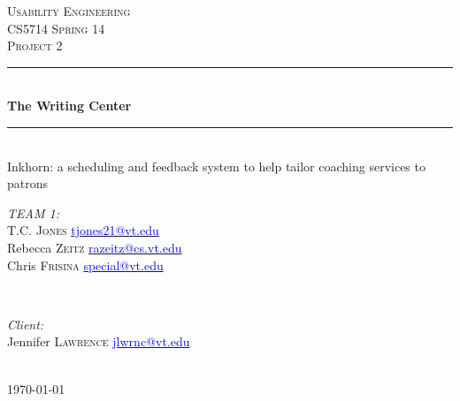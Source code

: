 \documentclass[12pt]{article} %
\begin{document}

\begin{titlepage}

\newcommand{\HRule}{\rule{\linewidth}{0.5mm}} %

\center %

\textsc{\LARGE Usability Engineering}\\[1.5cm] %
\textsc{\Large CS5714 Spring 14}\\[0.5cm] %
\textsc{\large Project 2}\\[0.5cm] %

\HRule \\[0.4cm]
{ \huge \bfseries The Writing Center }\\[0.4cm] %
\HRule \\[0.4cm]
{ \small Inkhorn: a scheduling and feedback system to help tailor coaching services to patrons }\\[0.4cm] %
\vspace{1.5cm}


\begin{minipage}{0.4\textwidth}
\begin{flushleft} \large
\emph{TEAM 1:}\\
T.C. \textsc{Jones} \href{mailto:tjones21@vt.edu}{\textcolor{blue}{tjones21@vt.edu}}\\
Rebecca \textsc{Zeitz} \href{mailto:razeitz@cs.vt.edu}{\textcolor{blue}{razeitz@cs.vt.edu}}\\
Chris \textsc{Frisina}  \href{mailto:special@vt.edu}{\textcolor{blue}{special@vt.edu}}\\
\end{flushleft}
\end{minipage}
~
\begin{minipage}{0.4\textwidth}
\begin{flushright} \large
\emph{Client:} \\
Jennifer \textsc{Lawrence}  \href{mailto:jlwrnc@vt.edu}{\textcolor{blue}{jlwrnc@vt.edu}}\\
\end{flushright}
\end{minipage}\\[4cm]

{\large \today}\\[3cm] %


\vfill %

\end{titlepage}
\end{document}
